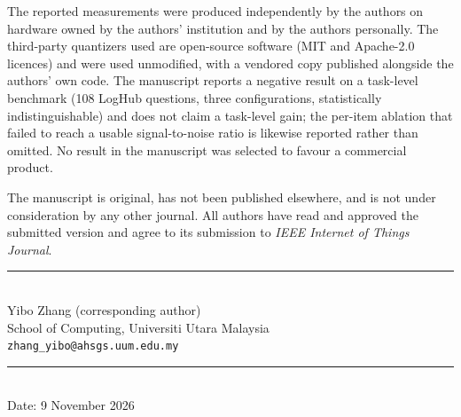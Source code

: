 \documentclass[10pt]{article}
\begin{document}
The reported measurements were produced independently by the authors on
hardware owned by the authors' institution and by the authors personally. The
third-party quantizers used are open-source software (MIT and Apache-2.0
licences) and were used unmodified, with a vendored copy published alongside
the authors' own code. The manuscript reports a negative result on a
task-level benchmark (108 LogHub questions, three configurations,
statistically indistinguishable) and does not claim a task-level gain; the
per-item ablation that failed to reach a usable signal-to-noise ratio is
likewise reported rather than omitted. No result in the manuscript was
selected to favour a commercial product.

The manuscript is original, has not been published elsewhere, and is not under
consideration by any other journal. All authors have read and approved the
submitted version and agree to its submission to \emph{IEEE Internet of Things
Journal}.

\vspace{18pt}
\noindent\begin{minipage}{0.55\textwidth}
\rule{6cm}{0.4pt}\\
Yibo Zhang (corresponding author)\\
School of Computing, Universiti Utara Malaysia\\
\texttt{zhang\_yibo@ahsgs.uum.edu.my}
\end{minipage}\hfill
\begin{minipage}{0.35\textwidth}
\raggedleft
\rule{4.5cm}{0.4pt}\\
Date: 9 November 2026
\end{minipage}

\vspace{14pt}
\end{document}
